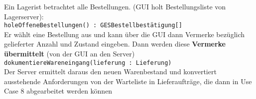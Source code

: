 Ein Lagerist betrachtet alle Bestellungen. (GUI holt Bestellungsliste von Lagerserver):\\
\medskip
\texttt{holeOffeneBestellungen() : GESBestellbestätigung[]}\\
\medskip
Er wählt eine Bestellung aus und kann über die GUI dann Vermerke bezüglich gelieferter Anzahl und Zustand eingeben. Dann werden diese \textbf{Vermerke übermittelt} (von der GUI an den Server)\\
\medskip
\texttt{dokumentiereWareneingang(lieferung : Lieferung)}\\
\medskip
Der Server ermittelt daraus den neuen Warenbestand und konvertiert ausstehende Anforderungen von der Warteliste in Lieferaufträge, die dann in Use Case 8 abgearbeitet werden können